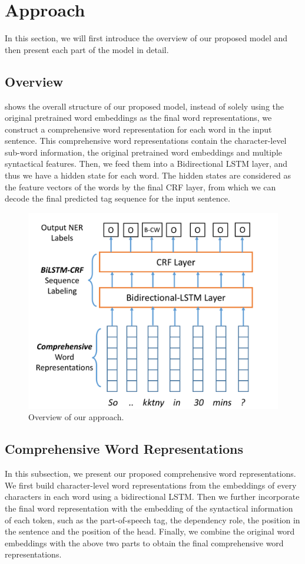 \section{Approach}
\label{sec:approach}
In this section, we will first introduce the overview of our proposed model and then present each part of the model in detail.
 
\subsection{Overview}
 shows the overall structure of our proposed model, 
instead of solely using the original pretrained word embeddings as the final word representations, 
we construct a comprehensive word representation for each word in the input sentence.
This comprehensive word representations contain the character-level sub-word information, the original pretrained word embeddings and multiple syntactical features. 
Then, we feed them into a Bidirectional LSTM layer, and thus we have a hidden state for each word. 
The hidden states are considered as the feature vectors of the words by the final CRF layer, from which we can decode the final predicted tag sequence for the input sentence.
\begin{figure}[th!]
	\includegraphics[width=\columnwidth]{figures/overview}
	\caption{Overview of our approach.}
	\label{fig:overall}
\end{figure}
 
\subsection{Comprehensive Word Representations}
In this subsection, we present our proposed comprehensive word representations. 
We first build character-level word representations from the embeddings of every characters in each word using a bidirectional LSTM. 
Then we further incorporate the final word representation with the embedding of the syntactical information of each token, such as the part-of-speech tag, the dependency role, the position in the sentence and the position of the head. 
Finally, we combine the original word embeddings with the above two parts to obtain the final comprehensive word representations.

